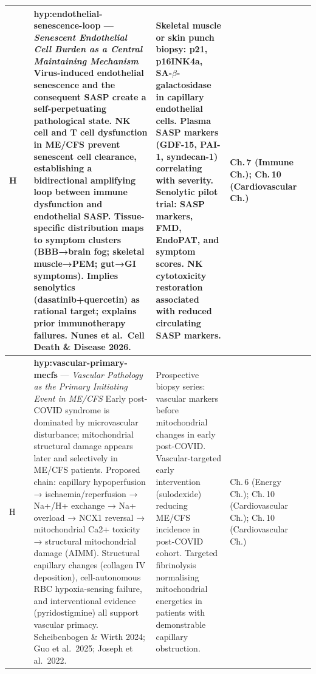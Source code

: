 \begin{longtable}{%
  p{3.0cm}
  >{\centering\arraybackslash}p{0.55cm}
  >{\centering\arraybackslash}p{1.0cm}
  p{3.8cm}
  p{3.8cm}
  p{2.2cm}
}

\hline
H & 0.40 &
\textbf{hyp:endothelial-senescence-loop} --- \emph{Senescent Endothelial Cell Burden as a Central Maintaining Mechanism}
Virus-induced endothelial senescence and the consequent SASP create a self-perpetuating pathological state. NK cell and T cell dysfunction in ME/CFS prevent senescent cell clearance, establishing a bidirectional amplifying loop between immune dysfunction and endothelial SASP.
Tissue-specific distribution maps to symptom clusters (BBB→brain fog; skeletal muscle→PEM; gut→GI symptoms).
Implies senolytics (dasatinib+quercetin) as rational target; explains prior immunotherapy failures.
Nunes et al.\ Cell Death \& Disease 2026.
&
Skeletal muscle or skin punch biopsy: p21, p16INK4a, SA-$\beta$-galactosidase in capillary endothelial cells.
Plasma SASP markers (GDF-15, PAI-1, syndecan-1) correlating with severity.
Senolytic pilot trial: SASP markers, FMD, EndoPAT, and symptom scores.
NK cytotoxicity restoration associated with reduced circulating SASP markers.
&
Ch.\,7 (Immune Ch.); Ch.\,10 (Cardiovascular Ch.) \\[6pt]

\hline
H & 0.45 &
\textbf{hyp:vascular-primary-mecfs} --- \emph{Vascular Pathology as the Primary Initiating Event in ME/CFS}
Early post-COVID syndrome is dominated by microvascular disturbance; mitochondrial structural damage appears later and selectively in ME/CFS patients. Proposed chain: capillary hypoperfusion → ischaemia/reperfusion → Na+/H+ exchange → Na+ overload → NCX1 reversal → mitochondrial Ca2+ toxicity → structural mitochondrial damage (AIMM). Structural capillary changes (collagen IV deposition), cell-autonomous RBC hypoxia-sensing failure, and interventional evidence (pyridostigmine) all support vascular primacy.
Scheibenbogen \& Wirth 2024; Guo et al.\ 2025; Joseph et al.\ 2022.
&
Prospective biopsy series: vascular markers before mitochondrial changes in early post-COVID.
Vascular-targeted early intervention (sulodexide) reducing ME/CFS incidence in post-COVID cohort.
Targeted fibrinolysis normalising mitochondrial energetics in patients with demonstrable capillary obstruction.
&
Ch.\,6 (Energy Ch.); Ch.\,10 (Cardiovascular Ch.); Ch.\,10 (Cardiovascular Ch.) \\[6pt]


\end{longtable}
